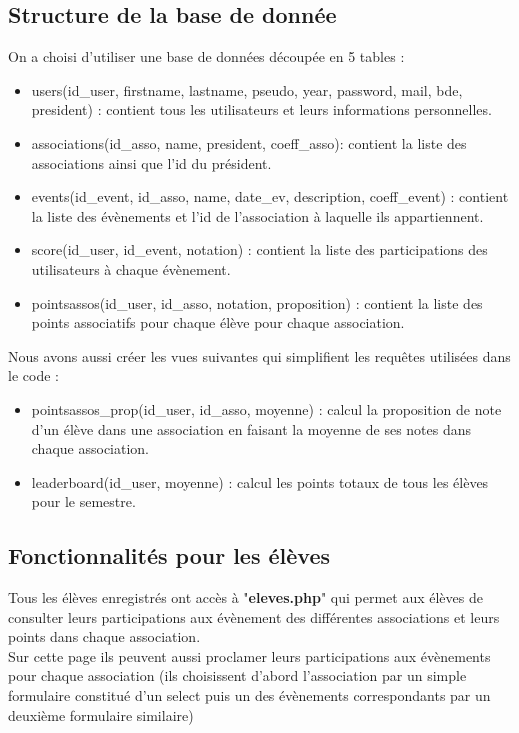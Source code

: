 \documentclass[french]{article}
\begin{document}
 \subsection{Structure de la base de donnée}
 On a choisi d'utiliser une base de données découpée en 5 tables : \\
 \begin{itemize}
 	\item users(id\_user, firstname, lastname, pseudo, year, password, mail, bde, president) : contient tous les utilisateurs et leurs informations personnelles.
 	\item associations(id\_asso, name, president, coeff\_asso): contient la liste des associations ainsi que l'id du président.
 	\item events(id\_event, id\_asso, name, date\_ev, description, coeff\_event) : contient la liste des évènements et l'id de l'association à laquelle ils appartiennent.
 	\item score(id\_user, id\_event, notation) : contient la liste des participations des utilisateurs à chaque évènement.
 	\item pointsassos(id\_user, id\_asso, notation, proposition) : contient la liste des points associatifs pour chaque élève pour chaque association.\\
 \end{itemize} 

Nous avons aussi créer les vues suivantes qui simplifient les requêtes utilisées dans le code : \\
\begin{itemize}
	\item pointsassos\_prop(id\_user, id\_asso, moyenne) : calcul la proposition de note d'un élève dans une association en faisant la moyenne de ses notes dans chaque association.
	\item leaderboard(id\_user, moyenne) : calcul les points totaux de tous les élèves pour le semestre.
\end{itemize}
\subsection{Fonctionnalités pour les élèves}
	Tous les élèves enregistrés ont accès à "\textbf{eleves.php}" qui permet aux élèves de consulter leurs participations aux évènement des différentes associations et leurs points dans chaque association. \\
	Sur cette page ils peuvent aussi proclamer leurs participations aux évènements pour chaque association (ils choisissent d'abord l'association par un simple formulaire constitué d'un select puis un des évènements correspondants par un deuxième formulaire similaire)\\
	
\end{document}
